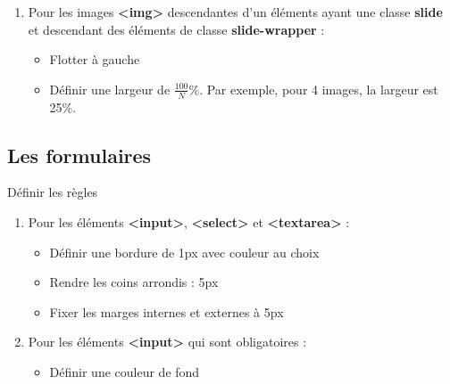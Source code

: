 \documentclass[11pt, a4paper]{article}
\begin{document}
\begin{enumerate}
\begin{multicols}{2}
	\begin{itemize}
		\item Définir la position comme \textbf{relative}
		\item Fixer la largeur à $N * 100\%$ (Si on a 4 images, donc 400\%)
		\item Éliminer les marges externes
		\item Rendre les coins arrondis : 10px
		\item Initialiser la position gauche à 0
		\item Définir une animation de 20s (ou au choix) en utilisant les étapes définies précédemment. 
		L'animation doit boucler infiniment et à l'alternance (va et vient) 
	\end{itemize} 
	\end{multicols}
	\item Pour les images \textbf{<img>} descendantes d'un éléments ayant une classe \textbf{slide} et descendant des éléments de classe \textbf{slide-wrapper} :
	\begin{multicols}{2}
	\begin{itemize}
		\item Flotter à gauche
		\item Définir une largeur de $\frac{100}{N}\%$. Par exemple, pour 4 images, la largeur est 25\%.
	\end{itemize} 
	\end{multicols}
\end{enumerate}

\subsection*{Les formulaires}

Définir les règles 
\begin{enumerate}
	\item Pour les éléments \textbf{<input>}, \textbf{<select>} et \textbf{<textarea>} :
	\begin{multicols}{2}
	\begin{itemize}
		\item Définir une bordure de 1px avec couleur au choix 
		\item Rendre les coins arrondis : 5px
		\item Fixer les marges internes et externes à 5px
	\end{itemize} 
	\end{multicols}
	\item Pour les éléments \textbf{<input>} qui sont obligatoires :
	\begin{itemize}
		\item Définir une couleur de fond
	\end{itemize} 
	
\end{enumerate}
\end{document}
